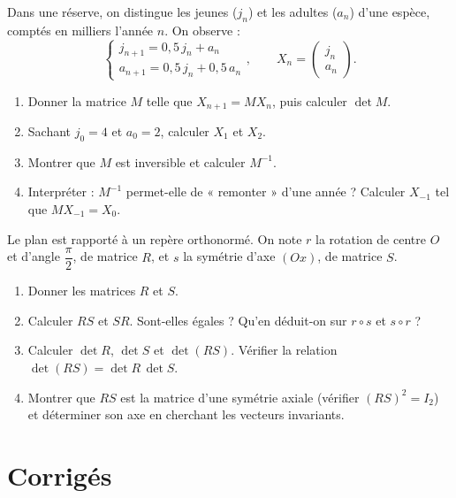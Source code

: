 Dans une réserve, on distingue les jeunes ($j_n$) et les adultes ($a_n$) d'une espèce, comptés
en milliers l'année $n$. On observe :
\[
\left\{\begin{array}{l}j_{n+1}=0{,}5\,j_n+a_n\\ a_{n+1}=0{,}5\,j_n+0{,}5\,a_n\end{array}\right.,
\qquad X_n=\begin{pmatrix}j_n\\a_n\end{pmatrix}.
\]
\begin{enumerate}[label=\arabic*)]
\item Donner la matrice $M$ telle que $X_{n+1}=MX_n$, puis calculer $\det M$.
\item Sachant $j_0=4$ et $a_0=2$, calculer $X_1$ et $X_2$.
\item Montrer que $M$ est inversible et calculer $M^{-1}$.
\item Interpréter : $M^{-1}$ permet-elle de « remonter » d'une année ? Calculer $X_{-1}$ tel que
$MX_{-1}=X_0$.
\end{enumerate}

Le plan est rapporté à un repère orthonormé. On note $r$ la rotation de centre $O$ et d'angle
$\dfrac\pi2$, de matrice $R$, et $s$ la symétrie d'axe $(Ox)$, de matrice $S$.
\begin{enumerate}[label=\arabic*)]
\item Donner les matrices $R$ et $S$.
\item Calculer $RS$ et $SR$. Sont-elles égales ? Qu'en déduit-on sur $r\circ s$ et $s\circ r$ ?
\item Calculer $\det R$, $\det S$ et $\det(RS)$. Vérifier la relation $\det(RS)=\det R\,\det S$.
\item Montrer que $RS$ est la matrice d'une symétrie axiale (vérifier $(RS)^2=I_2$) et déterminer
son axe en cherchant les vecteurs invariants.
\end{enumerate}

\section{Corrigés}

